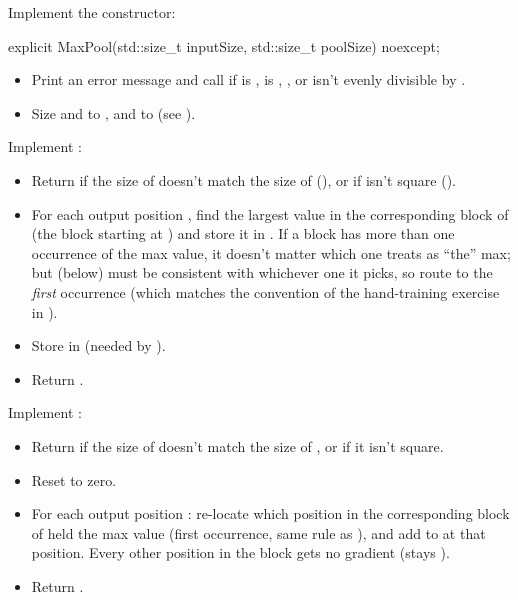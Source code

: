 \label{c9:ex:4}
Implement the constructor:

\begin{cppcode}
explicit MaxPool(std::size_t inputSize, std::size_t poolSize) noexcept;
\end{cppcode}

\begin{itemize}
  \item Print an error message and call  if  is ,
     is , , or  isn't evenly
    divisible by .
  \item Size  and  to , and  to
     (see ).
\end{itemize}

\label{c9:ex:5}
Implement :
\begin{itemize}
  \item Return  if the size of  doesn't match the size of 
    (), or if  isn't square ().
  \item For each output position , find the largest value in the corresponding
     block of  (the block starting at
    ) and store it in . If a block has more
    than one occurrence of the max value, it doesn't matter which one  treats as
    ``the'' max; but  (below) must be consistent with whichever one it picks,
    so route to the \emph{first} occurrence (which matches the convention of the hand-training
    exercise in ).
  \item Store  in  (needed by ).
  \item Return .
\end{itemize}

\label{c9:ex:6}
Implement :
\begin{itemize}
  \item Return  if the size of  doesn't match the size of
    , or if it isn't square.
  \item Reset  to zero.
  \item For each output position : re-locate which position in the corresponding block
    of  held the max value (first occurrence, same rule as ), and
    add  to  at that position. Every other
    position in the block gets no gradient (stays ).
  \item Return .
\end{itemize}

